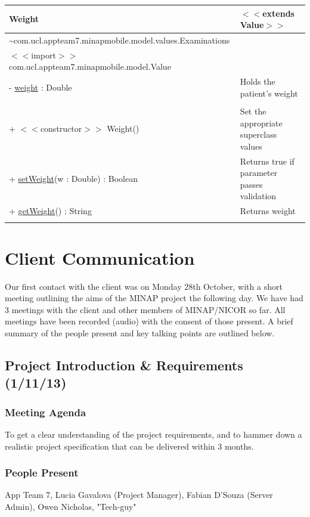 \documentclass[12pt,a4paper,oneside,titlepage]{article}
\begin{document}
\begin{center}
	\begin{tabular}{| p{13cm} | p{5cm} |}
	\hline
	\textbf{Weight} & \textbf{$<<$extends Value$>>$} \\ \hline
	\textasciitilde com.ucl.appteam7.minapmobile.model.values.Examinations	 &  \\ \hline
$<<$import$>>$ com.ucl.appteam7.minapmobile.model.Value	&  \\ \hline \hline
- \underline{weight} : Double & 	Holds the patient's weight \\ &\\ \hline \hline
+ $<<$constructor$>>$ Weight()	 & Set the appropriate superclass values \\ \hline
+ \underline{setWeight}(w : Double) : Boolean	 & Returns true if parameter passes validation \\ \hline
+ \underline{getWeight}() : String & 	Returns weight \\&\\ \hline
	\end{tabular}
\end{center}

\restoregeometry

\newpage
\section{Client Communication}
\label{sec:client}
Our first contact with the client was on Monday 28th October, with a short meeting outlining the aims of the MINAP project the following day. We have had 3 meetings with the client and other members of MINAP/NICOR so far. All meetings have been recorded (audio) with the consent of those present. A brief summary of the people present and key talking points are outlined below.
\subsection{Project Introduction \& Requirements (1/11/13)}
\subsubsection{Meeting Agenda}
To get a clear understanding of the project requirements, and to hammer down a realistic project specification that can be delivered within 3 months. 
\subsubsection{People Present}
App Team 7, Lucia Gavalova (Project Manager), Fabian D'Souza (Server Admin), Owen Nicholas, "Tech-guy"
\end{document}
